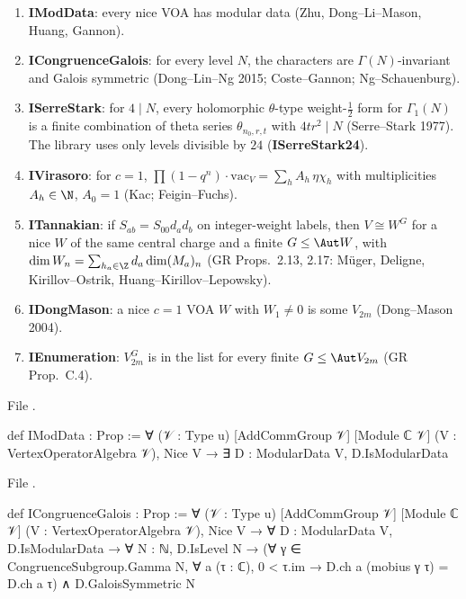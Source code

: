 \begin{definition}\label{l22:def:inputs}
\begin{enumerate}
\item \textbf{IModData}: every nice VOA has modular data (Zhu, Dong--Li--Mason, Huang, Gannon).
\item \textbf{ICongruenceGalois}: for every level $N$, the characters are $\Gamma(N)$-invariant and Galois
  symmetric (Dong--Lin--Ng 2015; Coste--Gannon; Ng--Schauenburg).
\item \textbf{ISerreStark}: for $4\mid N$, every holomorphic $\theta$-type weight-$\frac12$ form for
  $\Gamma_1(N)$ is a finite combination of theta series $\theta_{n_0,r,t}$ with $4tr^2\mid N$ (Serre--Stark
  1977). The library uses only levels divisible by $24$ (\textbf{ISerreStark24}).
\item \textbf{IVirasoro}: for $c=1$, $\prod(1-q^n)\cdot\mathrm{vac}_V=\sum_h A_h\,\eta\chi_h$ with
  multiplicities $A_h\in\N$, $A_0=1$ (Kac; Feigin--Fuchs).
\item \textbf{ITannakian}: if $S_{ab}=S_{00}d_ad_b$ on integer-weight labels, then $V\cong W^G$ for a nice $W$ of
  the same central charge and a finite $G\le\Aut W$, with $\dim W_n=\sum_{h_a\in\Z}d_a\dim(M_a)_n$ (GR
  Props.~2.13, 2.17: Müger, Deligne, Kirillov--Ostrik, Huang--Kirillov--Lepowsky).
\item \textbf{IDongMason}: a nice $c=1$ VOA $W$ with $W_1\ne0$ is some $V_{2m}$ (Dong--Mason 2004).
\item \textbf{IEnumeration}: $V_{2m}^G$ is in the list for every finite $G\le\Aut V_{2m}$ (GR Prop.~C.4).
\end{enumerate}
\end{definition}
\noindent File .
\begin{leancode}
def IModData : Prop :=
  ∀ (𝒱 : Type u) [AddCommGroup 𝒱] [Module ℂ 𝒱] (V : VertexOperatorAlgebra 𝒱), Nice V →
    ∃ D : ModularData V, D.IsModularData
\end{leancode}
\noindent File .
\begin{leancode}
def ICongruenceGalois : Prop :=
  ∀ (𝒱 : Type u) [AddCommGroup 𝒱] [Module ℂ 𝒱] (V : VertexOperatorAlgebra 𝒱), Nice V →
    ∀ D : ModularData V, D.IsModularData → ∀ N : ℕ, D.IsLevel N →
      (∀ γ ∈ CongruenceSubgroup.Gamma N, ∀ a (τ : ℂ), 0 < τ.im →
        D.ch a (mobius γ τ) = D.ch a τ) ∧ D.GaloisSymmetric N
\end{leancode}
